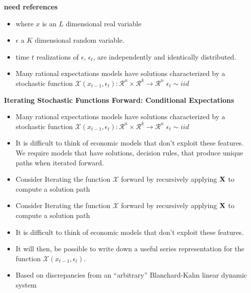\documentclass[12pt]{article}
\begin{document}
{\bf need references }

\begin{itemize}
\item where $x$ is an $L$ dimensional real variable
\item $\epsilon$ a $K$ dimensional random variable.
\item time $t$ realizations of $\epsilon$, $\epsilon_t$, are independently and identically distributed.  
\item Many rational expectations models have solutions characterized by a stochastic function $\mathcal{X}(x_{t-1},\epsilon_t):\mathcal{R}^n \times \mathcal{R}^k \rightarrow \mathcal{R}^n$ $\epsilon_t \sim iid$

\end{itemize}

 {\bf Iterating Stochastic Functions Forward: Conditional Expectations}

 \begin{itemize}

\item Many rational expectations models have solutions characterized by a stochastic function $\mathcal{X}(x_{t-1},\epsilon_t):\mathcal{R}^n \times \mathcal{R}^k \rightarrow \mathcal{R}^n$ $\epsilon_t \sim iid$
\item It is difficult to think of economic models  that don't exploit these features.
We require models that have solutions, decision rules, that produce unique paths when iterated forward.  
\item Consider Iterating the function $\mathcal{X}$ forward by 
recursively applying $\mathbf{X}{}$ to compute a solution path


\item Consider Iterating the function $\mathcal{X}$ forward by 
recursively applying $\mathbf{X}{}$ to compute a solution path
\item It is difficult to think of economic models  that don't exploit these features.


 \item It will then, be possible to write down a useful 
series representation for
the function $\mathcal{X}(x_{t-1},\epsilon_t)$.
\item Based on discrepancies from an ``arbitrary'' Blanchard-Kahn linear dynamic system
 \end{itemize}

\end{document}
